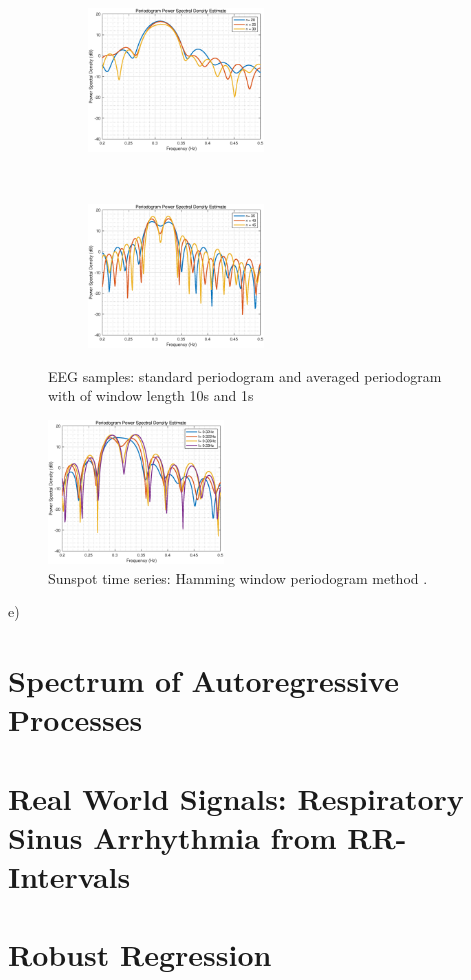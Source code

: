 \begin{figure}[H]
    \centering
    \begin{subfigure}{0.35\textwidth}
        \centering
        \includegraphics[height=1.5in]{Part1/1_3_d1.eps}
    \end{subfigure}
    ~ 
    \begin{subfigure}{0.35\textwidth}
        \centering
        \includegraphics[height=1.5in]{Part1/1_3_d2.eps}
    \end{subfigure}
    \caption{EEG samples: standard periodogram and averaged  periodogram with of window length 10s and 1s}
    \label{fig:1_3_d_1}
\end{figure}
\begin{figure}[H]
    \centering
        \includegraphics[height=1.5in]{Part1/1_3_d3.eps}
    \caption{Sunspot time series: Hamming window periodogram method .}
    \label{fig:1_3_d2}
\end{figure}
e)
\section{Spectrum of Autoregressive Processes}
%
\section{Real World Signals: Respiratory Sinus Arrhythmia from RR-Intervals}

\section{Robust Regression}

